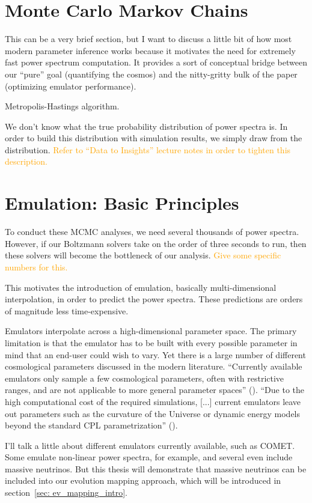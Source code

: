 \section{Monte Carlo Markov Chains}

This can be a very brief section, but I want to discuss a little bit of how most modern parameter inference works because it motivates the need for extremely fast power spectrum computation. It provides a sort of conceptual bridge between our ``pure'' goal (quantifying the cosmos) and the nitty-gritty bulk of the paper (optimizing emulator performance).

Metropolis-Hastings algorithm.

We don't know what the true probability distribution of power spectra is. In order to build this distribution with simulation results, we simply draw from the distribution. \textcolor{orange}{Refer to ``Data to Insights'' lecture notes in order to tighten this description.}

\section{Emulation: Basic Principles}
\label{sec: emulation_intro}

To conduct these MCMC analyses, we need several thousands of power spectra. However, if our Boltzmann solvers take on the order of three seconds to run, then these solvers will become the bottleneck of our analysis. \textcolor{orange}{Give some specific numbers for this.}

This motivates the introduction of emulation, basically multi-dimensional interpolation, in order to predict the power spectra. These predictions are orders of magnitude less time-expensive. 

Emulators interpolate across a high-dimensional parameter space. The primary
limitation is that the emulator has to be built with every possible parameter
in mind that an end-user could wish to vary. Yet there is a large number of
different cosmological parameters discussed in the modern literature.
``Currently available emulators only sample a few cosmological parameters,
often with restrictive ranges, and are not applicable to more general
parameter
spaces'' (). ``Due to the high computational cost of the required
simulations, [...] current emulators leave out parameters such as the
curvature
of the Universe or dynamic energy models beyond the standard CPL
parametrization'' ().

I'll talk a little about different emulators currently available, such as COMET. Some emulate non-linear power spectra, for example, and several even include massive neutrinos. But this thesis will demonstrate that massive neutrinos can be included into our evolution mapping approach, which will be introduced in section~\ref{sec: ev_mapping_intro}.

